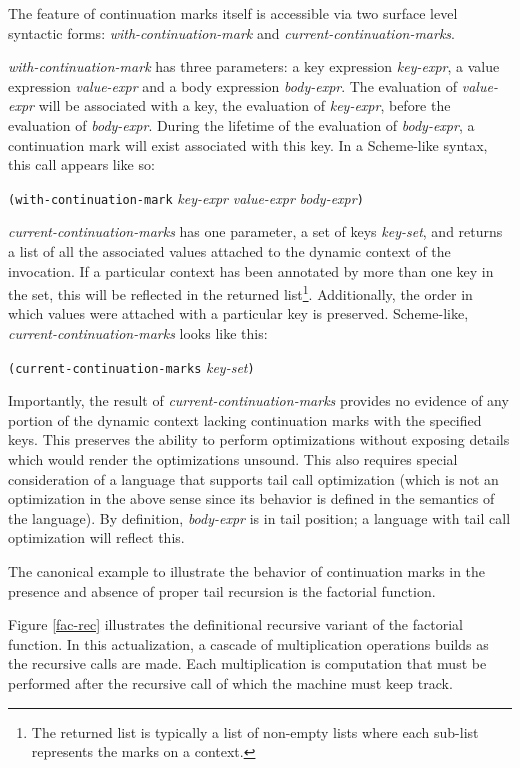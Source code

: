 \documentclass[ms]{byuprop}
\newcounter{definition}
\newcounter{example}
\begin{document}
The feature of continuation marks itself is accessible via two surface level syntactic
forms: \emph{with-continuation-mark} and \emph{current-continuation-marks}.

\emph{with-continuation-mark} has three parameters: a key expression \emph{key-expr}, a 
value expression \emph{value-expr} and a body expression \emph{body-expr}. The evaluation 
of \emph{value-expr} will be associated with a key, the evaluation of \emph{key-expr}, 
before the evaluation of \emph{body-expr}. During the lifetime of the evaluation of 
\emph{body-expr}, a continuation mark will exist associated with this key. In a Scheme-like 
syntax, this call appears like so:

\texttt{(with-continuation-mark} \emph{key-expr} \emph{value-expr} \emph{body-expr}\texttt{)}

\emph{current-continuation-marks} has one parameter, a set of keys \emph{key-set}, and returns a list of
all the associated values attached to the dynamic context of the invocation. If a particular 
context has been annotated by more than one key in the set, this will be reflected in the 
returned list\footnote{The returned list is typically a list of non-empty lists where each 
sub-list represents the marks on a context.}. Additionally, the order in which values were 
attached with a particular key is preserved. Scheme-like, \emph{current-continuation-marks}
looks like this:

\texttt{(current-continuation-marks} \emph{key-set}\texttt{)}

Importantly, the result of \emph{current-continuation-marks} provides no evidence of any portion of the
dynamic context lacking continuation marks with the specified keys. This preserves the
ability to perform optimizations without exposing details which would render the
optimizations unsound. This also requires special consideration of a language that
supports tail call optimization (which is not an optimization in the above sense since its
behavior is defined in the semantics of the language). By definition, \emph{body-expr} is 
in tail position; a language with tail call optimization will reflect this.

The canonical example to illustrate the behavior of continuation marks in the presence and
absence of proper tail recursion is the factorial function.

Figure \ref{fac-rec} illustrates the definitional recursive variant of the factorial
function. In this actualization, a cascade of multiplication operations builds as the
recursive calls are made. Each multiplication is computation that must be performed after
the recursive call of which the machine must keep track.
\end{document}

